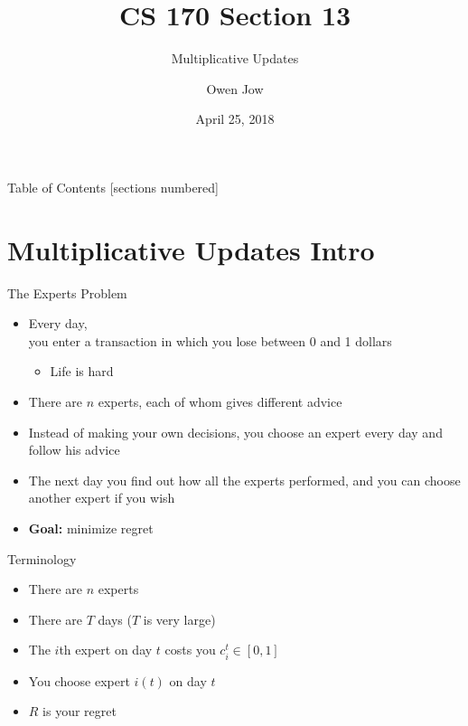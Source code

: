 \documentclass[10pt]{beamer}
\title{CS 170 Section 13}
\subtitle{Multiplicative Updates}
\date{April 25, 2018}
\author{Owen Jow}
\institute{University of California, Berkeley}
\begin{document}
\maketitle

\begin{frame}{Table of Contents}
  [sections numbered]
  \tableofcontents[hideallsubsections]
\end{frame}

\section{Multiplicative Updates Intro}

\begin{frame}[fragile]{The Experts Problem}

\begin{itemize}
\item Every day, \\
you enter a transaction in which you lose between 0 and 1 dollars
  \begin{itemize}
  \item Life is hard
  \end{itemize}
\item There are $n$ experts, each of whom gives different advice
\item Instead of making your own decisions,
you choose an expert every day and follow his advice
\item The next day you find out how all the experts performed,
and you can choose another expert if you wish
\item \textbf{Goal:} minimize regret
\end{itemize}

\end{frame}

\begin{frame}[fragile]{Terminology}

\begin{itemize}
\item There are $n$ experts
\item There are $T$ days ($T$ is very large)
\item The $i$th expert on day $t$ costs you $c_i^t \in [0, 1]$
\item You choose expert $i(t)$ on day $t$
\item $R$ is your regret
\end{itemize}

\end{frame}
\end{document}
